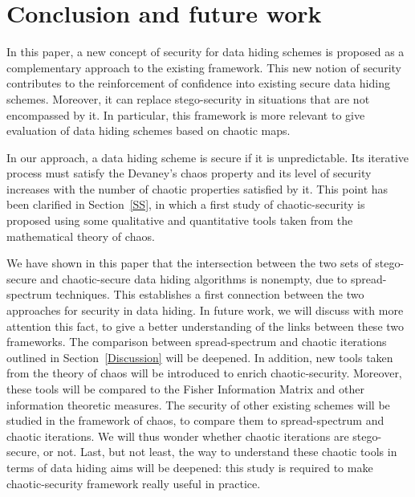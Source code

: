 \documentclass{llncs}
\begin{document}
\section{Conclusion and future work}

In this paper, a new concept of security for data hiding schemes is proposed as a complementary approach to the existing framework. This new notion of security contributes to the reinforcement of confidence into existing secure data hiding schemes. Moreover, it can replace stego-security in situations that are not encompassed by it. In particular, this framework is more relevant to give evaluation of data hiding schemes based on chaotic maps. 

In our approach, a data hiding scheme is secure if it is unpredictable. Its iterative process must satisfy the Devaney's chaos property and its level of security increases with the number of chaotic properties satisfied by it. This point has been clarified in Section~\ref{SS}, in which a first study of chaotic-security is proposed using some qualitative and quantitative tools taken from the mathematical theory of chaos.


We have shown in this paper that the intersection between the two sets of stego-secure and  chaotic-secure data hiding algorithms is nonempty, due to spread-spectrum techniques. This establishes a first connection between the two approaches for security in data hiding. In future work, we will discuss with more attention this fact, to give a better understanding of the links between these two frameworks. The comparison between spread-spectrum and chaotic iterations outlined in Section~\ref{Discussion} will be deepened. 
In addition, new tools taken from the theory of chaos will be introduced to enrich chaotic-security. Moreover, these tools will be compared to the Fisher Information Matrix and other information theoretic measures. The security of other existing schemes will be studied in the framework of chaos, to compare them to spread-spectrum and chaotic iterations. We will thus wonder whether chaotic iterations are stego-secure, or not. Last, but not least, the way to understand these chaotic tools in terms of data hiding aims will be deepened: this study is required to make chaotic-security framework really useful in practice. 





\end{document}
